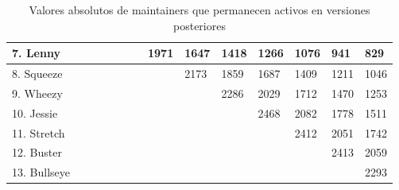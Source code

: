 \documentclass[a4paper, 12pt]{book}
\begin{document}
\begin{table}[htbp]
{\begin{tabular}{|l|l|l|l|l|l|l|l|l|l|l|l|l|l|}
			7. Lenny     & \cellcolor[HTML]{000000} & \cellcolor[HTML]{000000} & \cellcolor[HTML]{000000} & \cellcolor[HTML]{000000} & \cellcolor[HTML]{000000} & \cellcolor[HTML]{000000} & 1971                     & 1647                     & 1418                     & 1266                     & 1076                     & 941                      & 829           \\ \hline
			8. Squeeze   & \cellcolor[HTML]{000000} & \cellcolor[HTML]{000000} & \cellcolor[HTML]{000000} & \cellcolor[HTML]{000000} & \cellcolor[HTML]{000000} & \cellcolor[HTML]{000000} & \cellcolor[HTML]{000000} & 2173                     & 1859                     & 1687                     & 1409                     & 1211                     & 1046          \\ \hline
			9. Wheezy    & \cellcolor[HTML]{000000} & \cellcolor[HTML]{000000} & \cellcolor[HTML]{000000} & \cellcolor[HTML]{000000} & \cellcolor[HTML]{000000} & \cellcolor[HTML]{000000} & \cellcolor[HTML]{000000} & \cellcolor[HTML]{000000} & 2286                     & 2029                     & 1712                     & 1470                     & 1253          \\ \hline
			10. Jessie   & \cellcolor[HTML]{000000} & \cellcolor[HTML]{000000} & \cellcolor[HTML]{000000} & \cellcolor[HTML]{000000} & \cellcolor[HTML]{000000} & \cellcolor[HTML]{000000} & \cellcolor[HTML]{000000} & \cellcolor[HTML]{000000} & \cellcolor[HTML]{000000} & 2468                     & 2082                     & 1778                     & 1511          \\ \hline
			11. Stretch  & \cellcolor[HTML]{000000} & \cellcolor[HTML]{000000} & \cellcolor[HTML]{000000} & \cellcolor[HTML]{000000} & \cellcolor[HTML]{000000} & \cellcolor[HTML]{000000} & \cellcolor[HTML]{000000} & \cellcolor[HTML]{000000} & \cellcolor[HTML]{000000} & \cellcolor[HTML]{000000} & 2412                     & 2051                     & 1742          \\ \hline
			12. Buster   & \cellcolor[HTML]{000000} & \cellcolor[HTML]{000000} & \cellcolor[HTML]{000000} & \cellcolor[HTML]{000000} & \cellcolor[HTML]{000000} & \cellcolor[HTML]{000000} & \cellcolor[HTML]{000000} & \cellcolor[HTML]{000000} & \cellcolor[HTML]{000000} & \cellcolor[HTML]{000000} & \cellcolor[HTML]{000000} & 2413                     & 2059          \\ \hline
			13. Bullseye & \cellcolor[HTML]{000000} & \cellcolor[HTML]{000000} & \cellcolor[HTML]{000000} & \cellcolor[HTML]{000000} & \cellcolor[HTML]{000000} & \cellcolor[HTML]{000000} & \cellcolor[HTML]{000000} & \cellcolor[HTML]{000000} & \cellcolor[HTML]{000000} & \cellcolor[HTML]{000000} & \cellcolor[HTML]{000000} & \cellcolor[HTML]{000000} & 2293          \\ \hline
		\end{tabular}
	}
	\caption{Valores absolutos de maintainers que permanecen activos en versiones posteriores}
\end{table}
\end{document}
